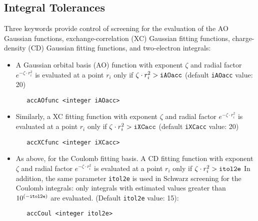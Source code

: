 \subsection{Integral Tolerances}
Three keywords provide control of screening for the evaluation of
the AO Gaussian functions, exchange-correlation (XC) Gaussian fitting 
functions, charge-density (CD) Gaussian fitting functions, 
and two-electron integrals:
\begin{itemize}
\item  A Gaussian orbital basis (AO) function with exponent $\zeta$
and radial factor $e^{-\zeta\cdot r_i^2}$ is 
evaluated  at a point $r_i$ only if 
$\zeta\cdot r_i^2 > {\tt iAOacc}$ (default {\tt iAOacc} value: 20)
\begin{verbatim}
   accAOfunc <integer iAOacc>
\end{verbatim}
\item Similarly, a XC fitting function with exponent $\zeta$
and radial factor $e^{-\zeta\cdot r_i^2}$ is 
evaluated  at a point $r_i$ only if 
$\zeta\cdot r_i^2 > {\tt iXCacc}$ (default {\tt iXCacc} value: 20)
\begin{verbatim}
   accXCfunc <integer iXCacc>
\end{verbatim}
\item As above, for the Coulomb fitting basis.  A  CD fitting function 
with exponent $\zeta$
and radial factor $e^{-\zeta\cdot r_i^2}$ is 
evaluated  at a point $r_i$ only if 
$\zeta\cdot r_i^2 > {\tt itol2e}$
In addition, the same
parameter {\tt itol2e} is used in Schwarz screening for the 
Coulomb integrals: only integrals with estimated
values greater than $10^{(-{\tt itol2e})}$ are evaluated. (Default
{\tt itol2e} value: 15):
\begin{verbatim}
   accCoul <integer itol2e>
\end{verbatim}
\end{itemize}
